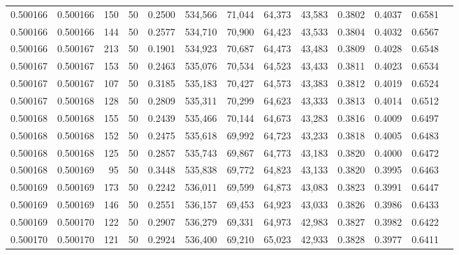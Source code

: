 \begin{tabular}{rrrrrrrrrrrrr}
0.500166 & 0.500166 &   150 &  50 &                                     0.2500 & 534,566 &  71,044 &  64,373 &  43,583 & 0.3802 & 0.4037 & 0.6581 \\
0.500166 & 0.500166 &   144 &  50 &                                     0.2577 & 534,710 &  70,900 &  64,423 &  43,533 & 0.3804 & 0.4032 & 0.6567 \\
0.500166 & 0.500167 &   213 &  50 &                                     0.1901 & 534,923 &  70,687 &  64,473 &  43,483 & 0.3809 & 0.4028 & 0.6548 \\
0.500167 & 0.500167 &   153 &  50 &                                     0.2463 & 535,076 &  70,534 &  64,523 &  43,433 & 0.3811 & 0.4023 & 0.6534 \\
0.500167 & 0.500167 &   107 &  50 &                                     0.3185 & 535,183 &  70,427 &  64,573 &  43,383 & 0.3812 & 0.4019 & 0.6524 \\
0.500167 & 0.500168 &   128 &  50 &                                     0.2809 & 535,311 &  70,299 &  64,623 &  43,333 & 0.3813 & 0.4014 & 0.6512 \\
0.500168 & 0.500168 &   155 &  50 &                                     0.2439 & 535,466 &  70,144 &  64,673 &  43,283 & 0.3816 & 0.4009 & 0.6497 \\
0.500168 & 0.500168 &   152 &  50 &                                     0.2475 & 535,618 &  69,992 &  64,723 &  43,233 & 0.3818 & 0.4005 & 0.6483 \\
0.500168 & 0.500168 &   125 &  50 &                                     0.2857 & 535,743 &  69,867 &  64,773 &  43,183 & 0.3820 & 0.4000 & 0.6472 \\
0.500168 & 0.500169 &    95 &  50 &                                     0.3448 & 535,838 &  69,772 &  64,823 &  43,133 & 0.3820 & 0.3995 & 0.6463 \\
0.500169 & 0.500169 &   173 &  50 &                                     0.2242 & 536,011 &  69,599 &  64,873 &  43,083 & 0.3823 & 0.3991 & 0.6447 \\
0.500169 & 0.500169 &   146 &  50 &                                     0.2551 & 536,157 &  69,453 &  64,923 &  43,033 & 0.3826 & 0.3986 & 0.6433 \\
0.500169 & 0.500170 &   122 &  50 &                                     0.2907 & 536,279 &  69,331 &  64,973 &  42,983 & 0.3827 & 0.3982 & 0.6422 \\
0.500170 & 0.500170 &   121 &  50 &                                     0.2924 & 536,400 &  69,210 &  65,023 &  42,933 & 0.3828 & 0.3977 & 0.6411 \\

\end{tabular}
